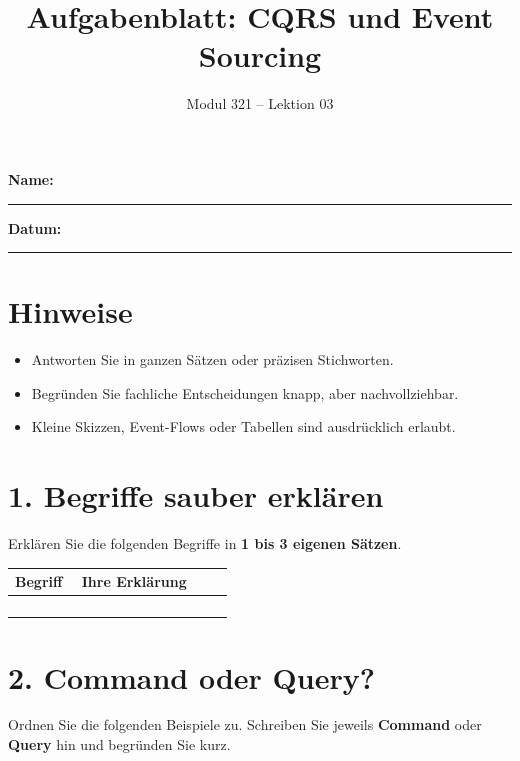 \documentclass[11pt,a4paper]{article}
\title{\textbf{Aufgabenblatt: CQRS und Event Sourcing}}
\author{Modul 321 -- Lektion 03}
\date{}
\newcommand{\answerline}[1]{\rule{#1}{0.4pt}}
\newcommand{\term}[1]{\fcolorbox{black!20}{blue!6}{\strut #1}}
\begin{document}
\maketitle

\textbf{Name:} \answerline{7cm} \hfill \textbf{Datum:} \answerline{3.5cm}

\vspace{0.8em}


\section*{Hinweise}
\begin{itemize}
  \item Antworten Sie in ganzen Sätzen oder präzisen Stichworten.
  \item Begründen Sie fachliche Entscheidungen knapp, aber nachvollziehbar.
  \item Kleine Skizzen, Event-Flows oder Tabellen sind ausdrücklich erlaubt.
\end{itemize}

\section*{1. Begriffe sauber erklären}
Erklären Sie die folgenden Begriffe in \textbf{1 bis 3 eigenen Sätzen}.

\begin{longtable}{|>{\raggedright\arraybackslash}p{0.28\linewidth}|>{\raggedright\arraybackslash}p{0.64\linewidth}|}
\hline
\textbf{Begriff} & \textbf{Ihre Erklärung} \\
\hline
\term{CQRS} & \\[2.4cm] \hline
\term{Command} & \\[2.0cm] \hline
\term{Query} & \\[2.0cm] \hline
\term{Event Sourcing} & \\[2.4cm] \hline
\end{longtable}

\section*{2. Command oder Query?}
Ordnen Sie die folgenden Beispiele zu. Schreiben Sie jeweils \textbf{Command} oder \textbf{Query} hin und begründen Sie kurz.
\end{document}

